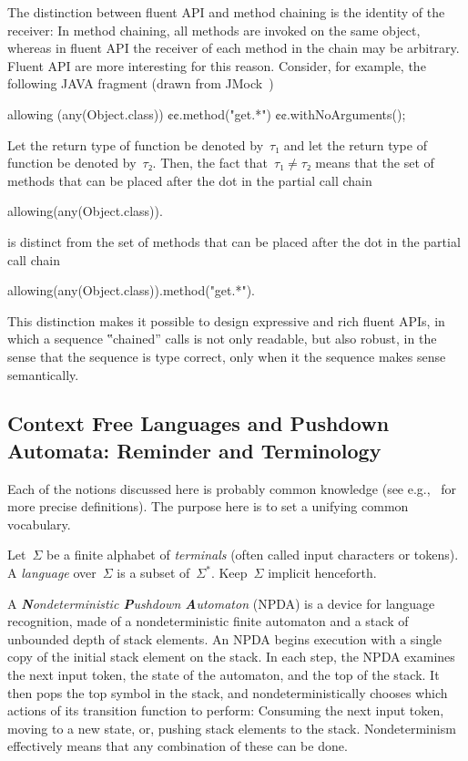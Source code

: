 The distinction between fluent API and method chaining is the identity of the receiver:
In method chaining, all methods are invoked on the same object, whereas in fluent API
  the receiver of each method in the chain may be arbitrary.
Fluent API are more interesting for this reason.
Consider, for example, the following JAVA fragment (drawn from JMock~\cite{Freeman:Pryce:06})
\begin{JAVA}
allowing (any(Object.class))
  ¢¢.method("get.*")
  ¢¢.withNoArguments();
\end{JAVA}
Let the return type of function  be denoted by~$τ₁$ and let the
  return type of function  be denoted by~$τ₂$.
Then, the fact that~$τ₁≠τ₂$ means that the set of methods that can be placed after the dot
  in the partial call chain
\begin{JAVA}
allowing(any(Object.class)).
\end{JAVA}
is distinct from the set of methods that can be placed after the dot in the partial call chain
\begin{JAVA}
allowing(any(Object.class)).method("get.*").
\end{JAVA}
This distinction makes it possible to design expressive and rich fluent APIs, in which a
  sequence ‟chained” calls is not only readable, but also robust, in the sense that the
  sequence is type correct, only when it the sequence makes sense semantically.

\subsection{Context Free Languages and Pushdown Automata: Reminder and Terminology}
Each of the notions discussed here is probably common knowledge
 (see e.g.,~\cite{Hopcroft:book:2001,Linz:2001} for more precise definitions).
The purpose here is to set a unifying common vocabulary.

Let~$Σ$ be a finite alphabet of \emph{terminals} (often called input characters or tokens).
A \emph{language} over~$Σ$
  is a subset of~$Σ^*$.
Keep~$Σ$ implicit henceforth.

A \emph{\textbf Nondeterministic \textbf Pushdown \textbf Automaton} (NPDA) is a device for language recognition,
  made of a nondeterministic finite automaton
  and a stack of unbounded depth of stack elements.
An NPDA begins execution with a single copy of the initial stack element on the stack.
In each step, the NPDA
  examines the next input token,
  the state of the automaton,
  and the top of the stack.
It then pops the top symbol in the stack, and nondeterministically chooses which actions of
  its transition function to perform:
  Consuming the next input token,
  moving to a new state,
  or, pushing stack elements to the stack.
Nondeterminism effectively means
  that any combination of these can be done.

